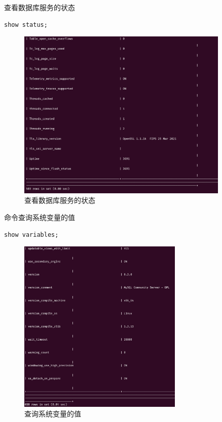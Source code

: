 \documentclass{article}
\begin{document}
查看数据库服务的状态

\begin{lstlisting}[language=sql]
show status;
\end{lstlisting}

\begin{figure}[H]
  \centering
  \includegraphics[width=0.9\textwidth]{img/16.png}
  \caption{查看数据库服务的状态}
\end{figure}

命令查询系统变量的值

\begin{lstlisting}[language=sql]
show variables;
\end{lstlisting}

\begin{figure}[H]
  \centering
  \includegraphics[width=0.7\textwidth]{img/17.png}
  \caption{查询系统变量的值}
\end{figure}
\end{document}
